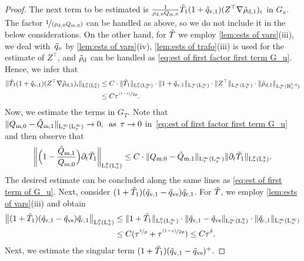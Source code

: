\documentclass[10pt]{amsart}
\theoremstyle{plain}
\theoremstyle{definition}
\theoremstyle{thm}
\numberwithin{equation}{section}
\newcommand{\rL}{\mathrm{L}}
\newcommand{\rLq}{\rL^q}
\newcommand{\rLp}{\rL^p}
\newcommand{\rH}{\mathrm{H}}
\newcommand{\del}{\partial}
\newcommand{\tas}{\enspace \text{as} \enspace}
\newcommand{\rd}{\mathrm{d}}
\renewcommand{\rm}{\mathrm{m}}
\newcommand{\rv}{\mathrm{v}}
\newcommand{\rvs}{\mathrm{vs}}
\newcommand{\rc}{\mathrm{c}}
\newcommand{\trho}{\Tilde{\rho}}
\newcommand{\tT}{\Tilde{T}}
\newcommand{\tq}{\Tilde{q}}
\newcommand{\tQ}{\Tilde{Q}}
\begin{document}
\begin{proof}
The next term to be estimated is $\frac{1}{\rho_{\rd,0}Q_{\rm,0}} \tT_1(1+\tq_{\rv,1})(Z^\top\nabla \trho_{\rd,1})_{i}$ in $G_u$.
The factor $\nicefrac{1}{(\rho_{\rd,0}Q_{\rm,0})}$ can be handled as above, so we do not include it in the below considerations.
On the other hand, for $\tT$ we employ \autoref{lem:ests of vars}(iii), we deal with~$\tq_{v}$  by \autoref{lem:ests of vars}(iv), \autoref{lem:ests of trafo}(iii) is used for the estimate of $Z^\top$,  and $\trho_{\rd} $ can be handled as 
\eqref{eq:est of first factor first term G_u}.
 Hence, we infer that 
\begin{equation*}
    \begin{aligned}
        \| \tT_1(1+\tq_{\rv,1})(Z^\top\nabla \trho_{\rd,1})_{i}\|_{\rL_\tau^p(\rL_x^{q})}
        &\leq C\cdot\|\tT_{1}\|_{\rL_\tau^p(\rL_x^\infty)}\cdot\|1+\tq_{\rv,1}\|_{\rL_\tau^\infty(\rL_x^\infty)} \cdot\| Z^\top\|_{\rL_\tau^\infty(\rL_x^\infty)}\cdot\|\trho_{d,1}\|_{\rL_\tau^\infty(\rH_x^{1,q})}\\
        &\leq C\tau^{\nicefrac{(1-s)}{2p}}.
    \end{aligned}
\end{equation*}
Now, we estimate the terms in $G_T$.
Note that $\|Q_{\rm,0}-\tQ_{\rm,1}\|_{\rL^\infty_\tau(\rL^\infty_x)}\to 0, \tas \tau \to 0 $ in~\eqref{eq:est of first factor first term G_u} and then observe that 
\begin{equation*}
   \left\|  \Bigl(1-\frac{\tQ_{\rm,1}}{Q_{\rm,0}}\Bigr)\del_t\tT_1\right\|_{\rLp_\tau(\rLq_x)}\leq C\cdot \|Q_{\rm,0}-\tQ_{\rm,1}\|_{\rL^\infty_\tau(\rL^\infty_x)}\|\del_t\tT_1\|_{\rLp_\tau(\rLq_x)}.
\end{equation*} 
The desired estimate can be concluded along the same lines as \eqref{eq:est of first term of G_u}.
Next, consider $(1+\tT_1)(\tq_{\rv,1} - \tq_{\rvs})\tq_{\rc,1}$. For $\tT$, we employ \autoref{lem:ests of vars}(iii) and obtain
\begin{equation*}
    \begin{aligned}
       \left\|(1+\tT_1)(\tq_{\rv,1} - \tq_{\rvs})\tq_{\rc,1}\right\|_{\rL_\tau^p(\rL_x^{q})}
       &\leq \|1+\tT_1\|_{\rL_\tau^p(\rL_x^\infty)}\cdot\|\tq_{\rv,1} - \tq_{\rvs}\|_{\rL_\tau^\infty(\rL_x^q)}\cdot\|\tq_{\rc,1}\|_{\rL^\infty_\tau(\rL^\infty_x)}\\&\leq C (\tau^{\nicefrac{1}{p}}+\tau^{\nicefrac{(1-s)}{2p}})\leq C\tau^\delta.
    \end{aligned}
\end{equation*}
Next, we estimate the singular term $(1+\tT_1)(\tq_{\rv,1} - \tq_{\rvs})^+$.

\end{proof}
\end{document}
